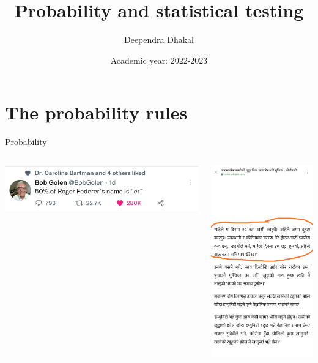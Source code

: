 \documentclass[11pt,ignorenonframetext,aspectratio=169]{beamer}
\title[]{Probability and statistical testing}
\author[
        Deependra Dhakal
    ]{Deependra Dhakal}
\institute[
    ]{
    Agriculture and Forestry University\\
\textit{ddhakal.rookie@gmail.com}\\
\url{https://rookie.rbind.io}
    }
\date[
      Academic year: 2022-2023
  ]{
      Academic year: 2022-2023
        }
\begin{document}
  \begin{frame}[plain]
  \titlepage
  \end{frame}



\hypertarget{the-probability-rules}{%
\section{The probability rules}\label{the-probability-rules}}

\begin{frame}{Probability}
\protect\hypertarget{probability}{}
\begin{columns}[T,onlytextwidth]


\includegraphics[width=0.95\linewidth]{../images/fifty_percent_of_roger_federer} 



\includegraphics[width=0.6\linewidth]{../images/power_of_legs} 

\end{columns}
\end{frame}
\end{document}
